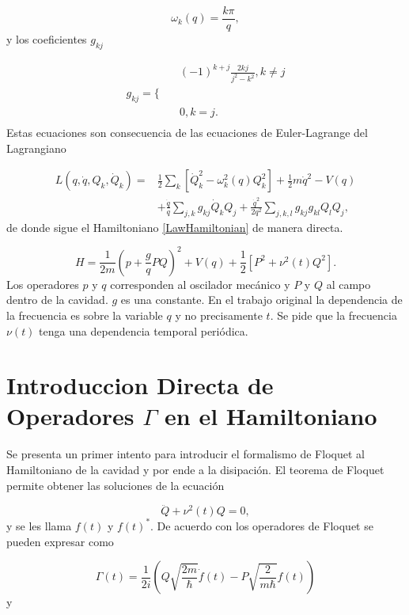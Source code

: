 \documentclass[10pt,a4paper]{report}
\begin{document}
\begin{equation}
\omega_k (q) = \frac{k\pi}{q},
\end{equation} y los coeficientes $g_{kj}$

\begin{align}
&(-1)^{k+j} \frac{2kj}{j^2-k^2}, k \neq j \\
g_{kj} = \Big \{\quad \nonumber &\\
& 0, k = j.\nonumber\\
\end{align} Estas ecuaciones son consecuencia de las ecuaciones de Euler-Lagrange del Lagrangiano 

\begin{align}
L(q,\dot{q},Q_k,\dot{Q}_k) =& \frac{1}{2} \sum_k [\dot{Q}_k^2-\omega_k^2(q)Q_k^2] + \frac{1}{2}m\dot{q}^2 - V(q)\\
&+\frac{\dot{q}}{q} \sum_{j,k} g_{kj}\dot{Q}_k Q_j + \frac{\dot{q}^2}{2q^2}\sum_{j,k,l} g_{kj}g_{kl}Q_l Q_j, \nonumber 
\end{align} de donde sigue el Hamiltoniano \eqref{LawHamiltonian} de manera directa. 

\begin{equation}\label{LawHamiltonian}
H = \frac{1}{2m}(p + \frac{g}{q} PQ)^2 + V(q) + \frac{1}{2}[P^2+\nu^2 (t)Q^2].
\end{equation} Los operadores $p$ y $q$ corresponden al oscilador mecánico y $P$ y $Q$ al campo dentro de la cavidad. $g$ es una constante. En el trabajo original la dependencia de la frecuencia es sobre la variable $q$ y no precisamente $t$. Se pide que la frecuencia $\nu(t)$ tenga una dependencia temporal periódica.

\section{Introduccion Directa de Operadores $\Gamma$ en el Hamiltoniano}

Se presenta un primer intento para introducir el formalismo de Floquet al Hamiltoniano de la cavidad y por ende a la disipación.  El teorema de Floquet permite obtener las soluciones de la ecuación

\begin{equation}\label{FloquetQ}
\ddot{Q} + \nu^2(t)Q=0,
\end{equation} y se les llama $f(t)$ y $f(t)^*$. De acuerdo con \cite{HanngiFM} los operadores de Floquet se pueden expresar como

\begin{equation}
\Gamma(t) = \frac{1}{2i}(Q\sqrt{\frac{2m}{\hbar}}\dot{f}(t)-P\sqrt{\frac{2}{m\hbar}}f(t))
\end{equation} y
\end{document}

